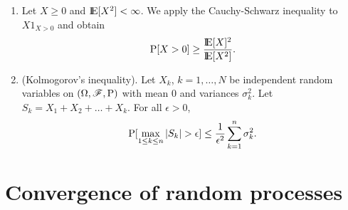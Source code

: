 \documentclass[a4paper,10pt]{article}
\begin{document}
\begin{enumerate}
\item Let $X\geq 0$ and $\E[X^2]<\infty$. We apply the Cauchy-Schwarz inequality to $X1_{X>0}$ and obtain
      \[
       \prob[X>0] \geq \frac{\E[X]^2}{\E[X^2]}.
      \]

\item (Kolmogorov's inequality). Let $X_k$, $k=1,\ldots, N$ be independent random variables on $(\Omega,\mathscr{F},\mathrm{P})$
      with mean $0$ and variances $\sigma_k^2$. Let $S_k = X_1 + X_2 + \ldots + X_k$. For all $\epsilon>0$,
      \[
       \prob[\max_{1\leq k\leq n}|S_k|>\epsilon] \leq \frac{1}{\epsilon^2}\sum_{k=1}^{n}\sigma_k^2.
      \]


\end{enumerate}

\section{Convergence of random processes}
\end{document}
